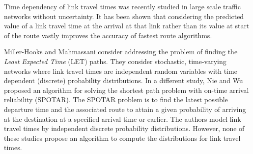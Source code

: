 
Time dependency of link travel times was recently studied in large scale traffic networks \cite{Yuan13,Pan12,Demiryurek11} without uncertainty. It has been shown that considering the predicted value of a link travel time at the arrival at that link rather than its value at start of the route vastly improves the accuracy of fastest route algorithms. 


Miller-Hooks and Mahmassani \cite{Miller-Hooks98, Miller-Hooks00} consider addressing the problem of finding the \textit{Least Expected Time} (LET) paths. They consider stochastic, time-varying networks where link travel times are independent random variables with time dependent (discrete) probability distributions. In a different study, Nie and Wu \cite{Nie09b} proposed an algorithm for solving the shortest path problem with on-time arrival reliability (SPOTAR). The SPOTAR problem is to find the latest possible departure time and the associated route to attain a given probability of arriving at the destination at a specified arrival time or earlier. The authors model link travel times by independent discrete probability distributions. However, none of these studies propose an algorithm to compute the distributions for link travel times.

